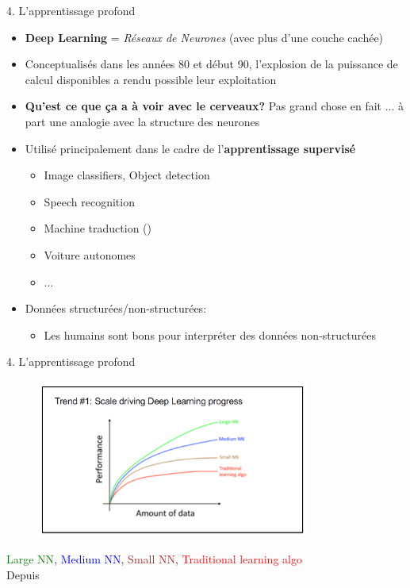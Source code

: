 \begin{frame}{4. L'apprentissage profond}
  \begin{itemize}
  \item \textbf{Deep Learning} = \textit{Réseaux de Neurones} (avec plus d'une couche cachée)
  \item Conceptualisés dans les années 80 et début 90, l'explosion de la puissance de calcul disponibles a rendu possible leur exploitation
  \item \textbf{Qu'est ce que ça a à voir avec le cerveaux?} Pas grand chose en fait ... à part une analogie avec la structure des neurones
  \item Utilisé principalement dans le cadre de l'\textbf{apprentissage supervisé}
    \begin{itemize}
    \item Image classifiers, Object detection
    \item Speech recognition
    \item Machine traduction (\href{https://www.deepl.com/translator}{\color{blue}{DeepL}})
    \item Voiture autonomes
    \item $\dots$
    \end{itemize}
  \item Données structurées/non-structurées:
    \begin{itemize}
    \item Les humains sont bons pour interpréter des données non-structurées
    \end{itemize}
  \end{itemize}
\end{frame}

\begin{frame}{4. L'apprentissage profond}
  \begin{figure}
    \includegraphics[width=0.8\textwidth]{fig/dataPerfAlgo.PNG}
  \end{figure}
  \vspace{-1cm}
  \begin{center}
    \footnotesize
    \textcolor{green}{Large NN}, \textcolor{blue}{Medium NN}, \textcolor{brown}{Small NN}, \textcolor{red}{Traditional learning algo}\\
    \vspace{0.1cm}
    \scriptsize
    Depuis \href{https://www.coursera.org/specializations/deep-learning}{\color{blue}{deeplearning.ai coursera}}
  \end{center}
\end{frame}
  
